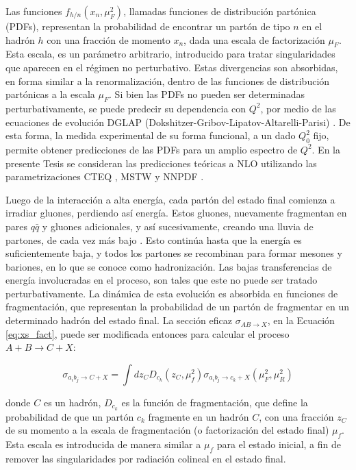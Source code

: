 Las funciones $f_{h/n}(x_{n}, \mu_{F}^2)$, llamadas funciones de distribución partónica (PDFs), representan la probabilidad de encontrar un partón de tipo $n$ en el hadrón $h$ con una fracción de
momento $x_n$, dada una escala de factorización $\mu_{F}$. Esta escala, es un parámetro arbitrario,
introducido para tratar singularidades que aparecen en el régimen no perturbativo. Estas
divergencias son absorbidas, en forma similar a la renormalización, dentro de las funciones
de distribución partónicas a la escala $\mu_F$. Si bien las PDFs no pueden ser determinadas
perturbativamente, se puede predecir su dependencia con $Q^2$, por medio de las ecuaciones
de evolución DGLAP (Dokshitzer-Gribov-Lipatov-Altarelli-Parisi) \cite{GRIBOV197178,Lipatov:1974qm,altarelli-parisi}. De esta forma, la
medida experimental de su forma funcional, a un dado $Q^2_0$ fijo, permite obtener predicciones
de las PDFs para un amplio espectro de $Q^2$. En la presente Tesis se consideran las predicciones teóricas a NLO utilizando las parametrizaciones CTEQ \cite{Lai:1999wy,Pumplin:2002vw}, MSTW \cite{Martin:2009iq, Martin:2009bu, Martin_2010} y NNPDF \cite{Ball:2012cx,Ball:2014uwa}.

Luego de la interacción a alta energía, cada partón del estado final comienza a irradiar gluones,
perdiendo así energía. Estos gluones, nuevamente fragmentan en pares $q\bar{q}$ y gluones adicionales, y así sucesivamente, creando una lluvia de partones, de cada vez más bajo \pt. Esto continúa hasta
que la energía es suficientemente baja, y todos los partones se recombinan para formar
mesones y bariones, en lo que se conoce como hadronización. Las bajas transferencias de
energía involucradas en el proceso, son tales que este no puede ser tratado perturbativamente. La dinámica de esta evolución es absorbida en funciones de fragmentación, que
representan la probabilidad de un partón de fragmentar en un determinado hadrón del
estado final. La sección eficaz $\sigma_{AB\to X}$, en la Ecuación \ref{eq:xs_fact}, puede ser modificada entonces para
calcular el proceso $A + B \to C + X$:

\begin{equation}
	\sigma_{a_i b_j \to C+X} = \int dz_{C} D_{c_k}(z_C, \mu_{f}^2) \sigma_{a_i b_j \to c_k + X}(\mu_{F}^2, \mu_{R}^2)
\end{equation}

\noindent
donde $C$ es un hadrón, $D_{c_k}$ es la función de fragmentación, que define la probabilidad
de que un partón $c_k$ fragmente en un hadrón $C$, con una fracción $z_C$ de su momento a la
escala de fragmentación (o factorización del estado final) $\mu_{f}$. Esta escala es introducida
de manera similar a $\mu_{f}$ para el estado inicial, a fin de remover las singularidades por
radiación colineal en el estado final.

